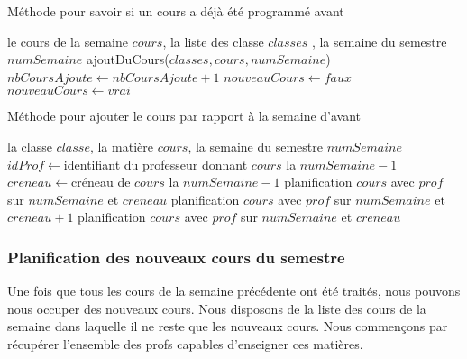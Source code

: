 \begin{algorithm}
\caption{Méthode pour savoir si un cours a déjà été programmé avant}
\begin{algorithmic}
\REQUIRE le cours de la semaine $cours$, la liste des classe $classes$ , la semaine du semestre $numSemaine$
\STATE ajoutDuCours($classes, cours, numSemaine$)
\STATE $nbCoursAjoute \leftarrow nbCoursAjoute + 1$
\ENDIF
\ENDFOR
{}
\STATE $nouveauCours \leftarrow faux$
\ELSE
\STATE $nouveauCours \leftarrow vrai$ 
\ENDIF
\end{algorithmic}
\end{algorithm}


\begin{algorithm}
\caption{Méthode pour ajouter le cours par rapport à la semaine d'avant}
\begin{algorithmic}
\REQUIRE la classe $classe$, la matière $cours$, la semaine du semestre $numSemaine$
\STATE $idProf \leftarrow $identifiant du professeur donnant $cours$ la $numSemaine - 1$
\STATE $creneau \leftarrow $créneau de $cours$ la $numSemaine - 1$
\STATE planification $cours$ avec $prof$ sur $numSemaine$ et $creneau$
\STATE planification $cours$ avec $prof$ sur $numSemaine$ et $creneau +1$
\ENDIF
\ELSE
{}
\STATE planification $cours$ avec $prof$ sur $numSemaine$ et $creneau$
\ENDIF
\ENDIF
\end{algorithmic}
\end{algorithm}

\newpage

\subsubsection{Planification des nouveaux cours du semestre}

Une fois que tous les cours de la semaine précédente ont été traités, nous pouvons nous occuper des nouveaux cours. Nous disposons de la liste des cours de la semaine dans laquelle il ne reste que les nouveaux cours. Nous commençons par récupérer l'ensemble des profs capables d'enseigner ces matières.\\

